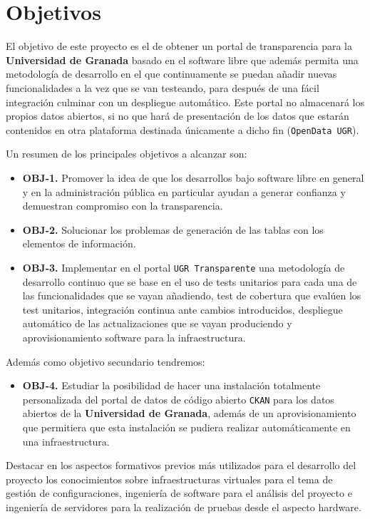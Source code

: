 \chapter{Objetivos}

El objetivo de este proyecto es el de obtener un portal de transparencia para la \textbf{Universidad de Granada} basado en el software libre que además permita una metodología de desarrollo en el que continuamente se puedan añadir nuevas funcionalidades a la vez que se van testeando, para después de una fácil integración culminar con un despliegue automático. Este portal no almacenará los propios datos abiertos, si no que hará de presentación de los datos que estarán contenidos en otra plataforma destinada únicamente a dicho fin ({\tt OpenData UGR}).

\bigskip
Un resumen de los principales objetivos a alcanzar son:

\begin{itemize}
  \item \textbf{OBJ-1.} Promover la idea de que los desarrollos bajo software libre en general y en la administración pública en particular ayudan a generar confianza y demuestran compromiso con la transparencia.
  \item \textbf{OBJ-2.} Solucionar los problemas de generación de las tablas con los elementos de información.
  \item \textbf{OBJ-3.} Implementar en el portal {\tt UGR Transparente} una metodología de desarrollo continuo que se base en el uso de tests unitarios para cada una de las funcionalidades que se vayan añadiendo, test de cobertura que evalúen los test unitarios, integración continua ante cambios introducidos, despliegue automático de las actualizaciones que se vayan produciendo y aprovisionamiento software para la infraestructura.
\end{itemize}

Además como objetivo secundario tendremos:

\begin{itemize}
  \item \textbf{OBJ-4.} Estudiar la posibilidad de hacer una instalación totalmente personalizada del portal de datos de código abierto {\tt CKAN} para los datos abiertos de la \textbf{Universidad de Granada}, además de un aprovisionamiento que permitiera que esta instalación se pudiera realizar automáticamente en una infraestructura.
\end{itemize}

\bigskip
Destacar en los aspectos formativos previos más utilizados para el desarrollo del proyecto los conocimientos sobre infraestructuras virtuales para el tema de gestión de configuraciones, ingeniería de software para el análisis del proyecto e ingeniería de servidores para la realización de pruebas desde el aspecto hardware.

